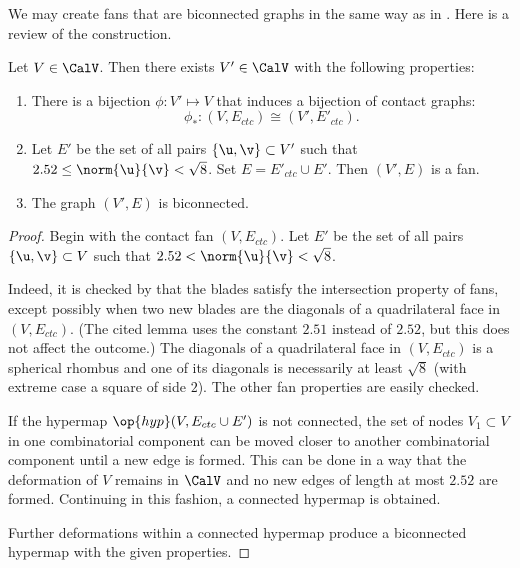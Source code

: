 We may create  fans that are biconnected graphs in the same way as in
\cite{Hales:2006:DCG}.  Here is a review
of the construction.



\begin{lemma}\label{lemma:V'-bi} 
Let $V\in \CalV$.  Then there exists $V'\in \CalV$ with
  the following  properties:
\begin{enumerate}\wasitemize 
\item There is a bijection $\phi:V'\mapsto V$ that induces a bijection
  of contact graphs:
\[
\phi_*:(V,E_{ctc}) \cong (V',E'_{ctc}).
\]
\item Let $E'$ be the set of all pairs $\{\u,\v\}\subset V'$
  such that $2.52\le\norm{\u}{\v} <\sqrt8$.  Set $E =
  E'_{ctc}\cup E'$.  Then $(V',E)$ is a fan.
\item The graph $(V',E)$ is biconnected.
\end{enumerate}\wasitemize 
\end{lemma}

\begin{proof}
  Begin with the contact fan $(V,E_{ctc})$.  Let $E'$ be the set
  of all pairs $\{\u,\v\}\subset V$ such that
  $2.52<\norm{\u}{\v}<\sqrt8$.

   Indeed, it is checked by
  \cite[Lemma~4.30]{Hales:2006:DCG} that the blades satisfy the
  intersection property of fans, except possibly when two new blades
  are the diagonals of a quadrilateral face in $(V,E_{ctc})$.  (The
  cited lemma uses the constant $2.51$ instead of $2.52$, but this
  does not affect the outcome.)  The diagonals of a quadrilateral face
  in $(V,E_{ctc})$ is a spherical rhombus and one of its diagonals is
  necessarily at least $\sqrt8$ (with extreme case a square of side
  $2$).  The other fan properties are easily checked.

  If the hypermap $\op{hyp}(V,E_{ctc}\cup E')$ is not connected,
  the set of nodes $V_1\subset V$ in one combinatorial component can
  be moved closer to another combinatorial component until a new edge
  is formed.  This can be done in a way that the deformation of $V$
  remains in $\CalV$ and no new edges of length at most $2.52$ are formed.
  Continuing in this fashion, a connected hypermap is obtained.

  Further deformations within a connected hypermap produce a
  biconnected hypermap with the given properties.
\end{proof}


